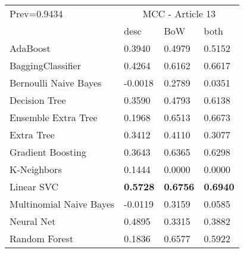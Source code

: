 \begin{tabular}{|l|l|l|l| }
\hline
Prev=0.9434 &  \multicolumn{3}{c|}{MCC - Article 13} \\
\cline{2-4} & desc & BoW & both \\ \hline
AdaBoost                & 0.3940 & 0.4979 & 0.5152\\
BaggingClassifier       & 0.4264 & 0.6162 & 0.6617\\
Bernoulli Naive Bayes   & -0.0018 & 0.2789 & 0.0351\\
Decision Tree           & 0.3590 & 0.4793 & 0.6138\\
Ensemble Extra Tree     & 0.1968 & 0.6513 & 0.6673\\
Extra Tree              & 0.3412 & 0.4110 & 0.3077\\
Gradient Boosting       & 0.3643 & 0.6365 & 0.6298\\
K-Neighbors             & 0.1444 & 0.0000 & 0.0000\\
Linear SVC              & {\bf 0.5728} & {\bf 0.6756} & {\bf 0.6940}\\
Multinomial Naive Bayes & -0.0119 & 0.3159 & 0.0585\\
Neural Net              & 0.4895 & 0.3315 & 0.3882\\
Random Forest           & 0.1836 & 0.6577 & 0.5922\\
\hline
\end{tabular}